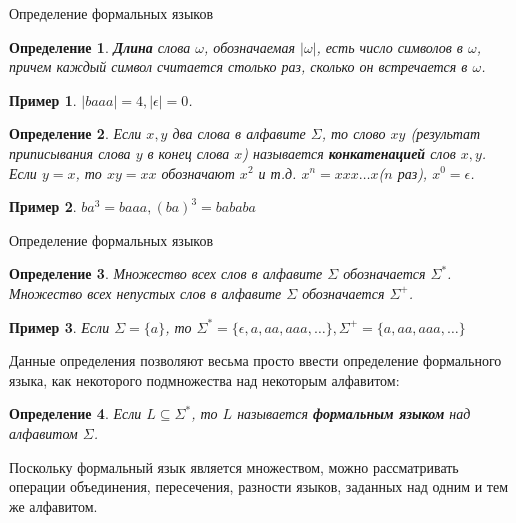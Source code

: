 \documentclass[12pt, pdf, hyperref={unicode},handout]{beamer}
\newtheorem{dfn}{Определение}
\newtheorem{exmpl}{Пример}
\begin{document}
\begin{frame}{Определение формальных языков}
  \begin{block}

    \small{
      \begin{dfn}
        \textbf{Длина} слова $\omega$, обозначаемая $|\omega|$, есть число символов в $\omega$, причем каждый символ считается столько раз, сколько он встречается в $\omega$.
      \end{dfn}
      \begin{exmpl}
        $|baaa|=4, |\epsilon|=0$.
      \end{exmpl}
      \begin{dfn}
        Если $x,y$ два слова в алфавите $\Sigma$, то слово $xy$ (результат приписывания слова $y$ в конец слова $x$) называется \textbf{конкатенацией} слов $x, y$. Если $y=x$, то $xy=xx$ обозначают $x^2$ и т.д. $x^n=xxx\ldots x $($n$ раз), $x^0=\epsilon$.
      \end{dfn}
      \begin{exmpl}
        $ba^3=baaa, (ba)^3=bababa$
      \end{exmpl}
      }

  \end{block}
  
\end{frame}

\begin{frame}{Определение формальных языков}
  \begin{block}

    \small{
      \begin{dfn}
        Множество всех слов в алфавите $\Sigma$ обозначается $\Sigma^*$. Множество всех непустых слов в алфавите $\Sigma$ обозначается $\Sigma^+$.
      \end{dfn}
      \begin{exmpl}
        Если $\Sigma=\{a\}$, то $\Sigma^*=\{\epsilon,a,aa,aaa,\ldots\}, \Sigma^+=\{a,aa,aaa,\ldots\}$
      \end{exmpl}
      Данные определения позволяют весьма просто ввести определение формального языка, как некоторого подмножества над некоторым алфавитом:
      \begin{dfn}
        Если $L\subseteq \Sigma^*$, то $L$ называется \textbf{формальным языком} над алфавитом $\Sigma$.
      \end{dfn}
      Поскольку формальный язык является множеством, можно рассматривать операции объединения, пересечения, разности языков, заданных над одним и тем же алфавитом.
      }

  \end{block}
  
\end{frame}
\end{document}
